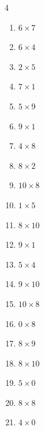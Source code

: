 \begin{multicols}{4}
\begin{enumerate}
  \item $6\times 7$
        \phantom{$=42$}

  \item $6\times 4$
        \phantom{$=24$}

  \item $2\times 5$
        \phantom{$=10$}

  \item $7\times 1$
        \phantom{$=7$}

  \item $5\times 9$
        \phantom{$=45$}

  \item $9\times 1$
        \phantom{$=9$}

  \item $4\times 8$
        \phantom{$=32$}

  \item $8\times 2$
        \phantom{$=16$}

  \item $10\times 8$
        \phantom{$=80$}

  \item $1\times 5$
        \phantom{$=5$}

  \item $8\times 10$
        \phantom{$=80$}

  \item $9\times 1$
        \phantom{$=9$}

  \item $5\times 4$
        \phantom{$=20$}

  \item $9\times 10$
        \phantom{$=90$}

  \item $10\times 8$
        \phantom{$=80$}

  \item $0\times 8$
        \phantom{$=0$}

  \item $8\times 9$
        \phantom{$=72$}

  \item $8\times 10$
        \phantom{$=80$}

  \item $5\times 0$
        \phantom{$=0$}

  \item $8\times 8$
        \phantom{$=64$}

  \item $4\times 0$
        \phantom{$=0$}


\end{enumerate}
\end{multicols}

